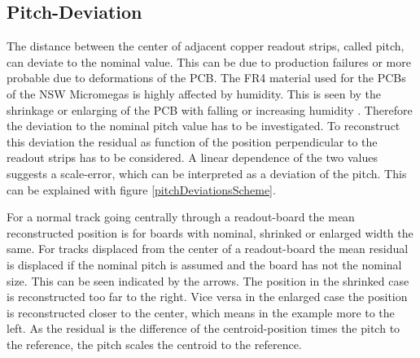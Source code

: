 \documentclass[
twoside,            %
BCOR1.4cm,          %
10pt,               %
headings=normal,    %
headsepline,        %
clearplainpage,		%
final,              %
div=14,
open=right,
bibliography=toc
]{scrreprt}
\begin{document}
\subsection{Pitch-Deviation}\label{pitchDeviation}

The distance between the center of adjacent copper readout strips, called pitch, can deviate to the nominal value.
This can be due to production failures or more probable due to deformations of the PCB.
The FR4 material used for the PCBs of the NSW Micromegas is highly affected by humidity.
This is seen by the shrinkage or enlarging of the PCB with falling or increasing humidity 
\cite{bortfeldtPCBhumidity}.
Therefore the deviation to the nominal pitch value has to be investigated.
To reconstruct this deviation the residual as function of the position perpendicular to the readout strips has to be considered.
A linear dependence of the two values suggests a scale-error, which can be interpreted as a deviation of the pitch.
This can be explained with figure \ref{pitchDeviationsScheme}.

For a normal track going centrally through a readout-board the mean reconstructed position is for boards with nominal, shrinked or enlarged width the same.
For tracks displaced from the center of a readout-board the mean residual is displaced if the nominal pitch is assumed and the board has not the nominal size.
This can be seen indicated by the arrows. 
The position in the shrinked case is reconstructed too far to the right.
Vice versa in the enlarged case the position is reconstructed closer to the center, which means in the example more to the left.
As the residual is the difference of the centroid-position times the pitch to the reference, the pitch scales the centroid to the reference.
\end{document}
